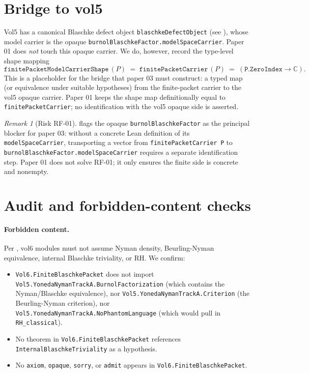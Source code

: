 \documentclass[11pt]{article}
\theoremstyle{plain}
\theoremstyle{definition}
\theoremstyle{remark}
\newtheorem{remark}[theorem]{Remark}
\newcommand{\C}{\mathbb{C}}
\newcommand{\code}[1]{\texttt{#1}}
\begin{document}
\section{Bridge to vol5}\label{sec:bridge}

Vol5 has a canonical Blaschke defect object \code{blaschkeDefectObject}
(see \cite{vol5BlaschkeDefectObject}), whose model carrier is the opaque
\code{burnolBlaschkeFactor.modelSpaceCarrier}.  Paper 01 does
\emph{not} touch this opaque carrier.  We do, however, record the type-level
shape mapping
\begin{equation}\label{eq:shape}
  \code{finitePacketModelCarrierShape}\,(P) \;=\;
   \code{finitePacketCarrier}\,(P) \;=\;
   (\code{P.ZeroIndex} \to \C).
\end{equation}
This is a placeholder for the bridge that paper 03 must construct: a
typed map (or equivalence under suitable hypotheses) from the
finite-packet carrier to the vol5 opaque carrier.  Paper 01 keeps the
shape map definitionally equal to \code{finitePacketCarrier}; no
identification with the vol5 opaque side is asserted.

\begin{remark}[Risk RF-01]\label{rem:rf01}
\cite[Section~8, RF-01]{vol5KnowledgeBase} flags the opaque
\code{burnolBlaschkeFactor} as the principal blocker for paper 03:
without a concrete Lean definition of its \code{modelSpaceCarrier},
transporting a vector from \code{finitePacketCarrier P} to
\code{burnolBlaschkeFactor.modelSpaceCarrier} requires a separate
identification step.  Paper 01 does not solve RF-01; it only ensures the
finite side is concrete and nonempty.
\end{remark}

\section{Audit and forbidden-content checks}\label{sec:audit}

\paragraph{Forbidden content.}  Per \cite{vol5NextSteps}, vol6 modules must
not assume Nyman density, Beurling-Nyman equivalence, internal Blaschke
triviality, or RH.  We confirm:
\begin{itemize}
  \item \code{Vol6.FiniteBlaschkePacket} does not import
        \code{Vol5.YonedaNymanTrackA.BurnolFactorization} (which contains
        the Nyman/Blaschke equivalence), nor
        \code{Vol5.YonedaNymanTrackA.Criterion} (the Beurling-Nyman
        criterion), nor
        \code{Vol5.YonedaNymanTrackA.NoPhantomLanguage} (which would pull
        in \code{RH\_classical}).
  \item No theorem in \code{Vol6.FiniteBlaschkePacket} references
        \code{InternalBlaschkeTriviality} as a hypothesis.
  \item No \code{axiom}, \code{opaque}, \code{sorry}, or \code{admit}
        appears in \code{Vol6.FiniteBlaschkePacket}.
\end{itemize}
\end{document}
